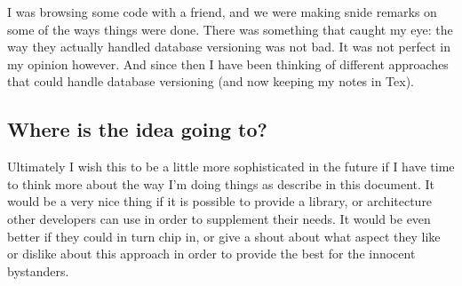 I was browsing some code with a friend, and we were making snide remarks on
some of the ways things were done. There was something that caught my eye: the
way they actually handled database versioning was not bad. It was not perfect
in my opinion however. And since then I have been thinking of different
approaches that could handle database versioning (and now keeping my notes in
Tex).

\subsection{Where is the idea going to?}

Ultimately I wish this to be a little more sophisticated in the future if I
have time to think more about the way I'm doing things as describe in this 
document. It would be a very nice thing if it is possible to provide a library,
or architecture other developers can use in order to supplement their needs. It
would be even better if they could in turn chip in, or give a shout about what
aspect they like or dislike about this approach in order to provide the best
for the innocent bystanders.

